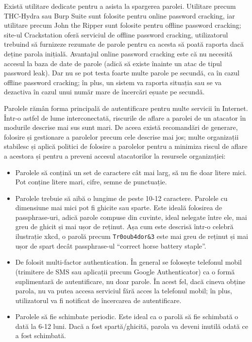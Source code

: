 Există utilitare dedicate pentru a asista la spargerea parolei. Utilitare precum THC-Hydra sau Burp Suite sunt folosite pentru online password cracking, iar utilitare precum John the Ripper sunt folosite pentru offline password cracking; site-ul Crackstation oferă serviciul de offline password cracking, utilizatorul trebuind să furnizeze rezumate de parole pentru ca acesta să poată raporta dacă deține parola inițială. Avantajul online password cracking este că nu necesită accesul la baza de date de parole (adică să existe înainte un atac de tipul password leak). Dar nu se pot testa foarte multe parole pe secundă, ca în cazul offline password cracking; în plus, un sistem va raporta situația sau se va dezactiva în cazul unui număr mare de încercări eșuate pe secundă.

Parolele rămân forma principală de autentificare pentru multe servicii în Internet. Într-o astfel de lume interconectată, riscurile de aflare a parolei de un atacator în modurile descrise mai sus sunt mari. De aceea există recomandări de generare, folosire și gestionare a parolelor precum cele descrise mai jos; multe organizații stabilesc și aplică politici de folosire a parolelor pentru a minimiza riscul de aflare a acestora și pentru a preveni accesul atacatorilor la resursele organizației:

\begin{itemize}
  \item Parolele să conțină un set de caractere cât mai larg, să nu fie doar litere mici. Pot conține litere mari, cifre, semne de punctuație.
  \item Parolele trebuie să aibă o lungime de peste 10-12 caractere. Parolele cu dimensiune mai mici pot fi ghicite sau sparte. Este ideală folosirea de passphrase-uri, adică parole compuse din cuvinte, ideal nelegate între ele, mai greu de ghicit și mai ușor de reținut. Așa cum este descrisă într-o celebră ilustrație xkcd, o parolă precum \texttt{Tr0oub4dor\&3} este mai greu de reținut și mai ușor de spart decât passphrase-ul “correct horse battery staple”.
  \item De folosit multi-factor authentication. În general se folosește telefonul mobil (trimitere de SMS sau aplicații precum Google Authenticator) ca o formă suplimentară de autentificare, nu doar parole. În acest fel, dacă cineva obține parola, nu va putea accesa serviciul fără acces la telefonul mobil; în plus, utilizatorul va fi notificat de încercarea de autentificare.
  \item Parolele să fie schimbate periodic. Este ideal ca o parolă să fie schimbată o dată la 6-12 luni. Dacă a fost spartă/ghicită, parola va deveni inutilă odată ce a fost schimbată.
\end{itemize}

